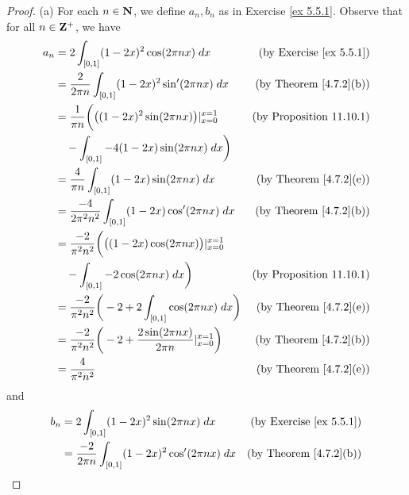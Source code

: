 \begin{proof}{(a)}
    For each \(n \in \mathbf{N}\), we define \(a_n, b_n\) as in Exercise \ref{ex 5.5.1}.
    Observe that for all \(n \in \mathbf{Z}^+\), we have
    \begin{align*}
        a_n & = 2 \int_{[0, 1]} (1 - 2x)^2 \cos(2 \pi n x) \; dx                                         & \text{(by Exercise \ref{ex 5.5.1})} \\
            & = \frac{2}{2 \pi n} \int_{[0, 1]} (1 - 2x)^2 \sin'(2 \pi n x) \; dx                        & \text{(by Theorem \ref{4.7.2}(b))}  \\
            & = \frac{1}{\pi n} \bigg(\big((1 - 2x)^2 \sin(2 \pi n x)\big)|_{x = 0}^{x = 1}              & \text{(by Proposition 11.10.1)}     \\
            & \quad - \int_{[0, 1]} -4 (1 - 2x) \sin(2 \pi n x) \; dx\bigg)                                                                    \\
            & = \frac{4}{\pi n} \int_{[0, 1]} (1 - 2x) \sin(2 \pi n x) \; dx                             & \text{(by Theorem \ref{4.7.2}(e))}  \\
            & = \frac{-4}{2 \pi^2 n^2} \int_{[0, 1]} (1 - 2x) \cos'(2 \pi n x) \; dx                     & \text{(by Theorem \ref{4.7.2}(b))}  \\
            & = \frac{-2}{\pi^2 n^2} \bigg(\big((1 - 2x) \cos(2 \pi n x)\big)|_{x = 0}^{x = 1}                                                 \\
            & \quad - \int_{[0, 1]} -2 \cos(2 \pi n x) \; dx\bigg)                                       & \text{(by Proposition 11.10.1)}     \\
            & = \frac{-2}{\pi^2 n^2} \bigg(-2 + 2 \int_{[0, 1]} \cos(2 \pi n x) \; dx\bigg)              & \text{(by Theorem \ref{4.7.2}(e))}  \\
            & = \frac{-2}{\pi^2 n^2} \bigg(-2 + \frac{2 \sin(2 \pi n x)}{2 \pi n}|_{x = 0}^{x = 1}\bigg) & \text{(by Theorem \ref{4.7.2}(b))}  \\
            & = \frac{4}{\pi^2 n^2}                                                                      & \text{(by Theorem \ref{4.7.2}(e))}
    \end{align*}
    and
    \begin{align*}
        b_n & = 2 \int_{[0, 1]} (1 - 2x)^2 \sin(2 \pi n x) \; dx                               & \text{(by Exercise \ref{ex 5.5.1})} \\
            & = \frac{-2}{2 \pi n} \int_{[0, 1]} (1 - 2x)^2 \cos'(2 \pi n x) \; dx             & \text{(by Theorem \ref{4.7.2}(b))}  \\

\end{align*}
\end{proof}
